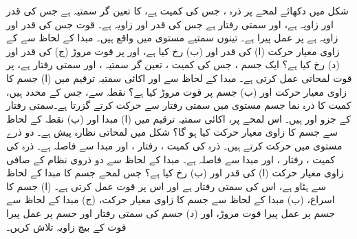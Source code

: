 شکل  میں دکھائے لمحے پر ذرہ ، جس کی کمیت  ہے، کا تعین گر سمتیہ  ہے  جس کی قدر  اور زاویہ  ہے، اور  سمتی رفتار  ہے جس کی قدر  اور زاویہ  ہے۔ قوت  جس کی قدر  اور زاویہ  ہے  پر عمل پیرا ہے۔  تینوں سمتیے  مستوی میں  واقع ہیں۔ مبدا کے لحاظ سے    کے زاوی معیار حرکت (ا) کی قدر اور (ب) رخ  کیا ہے، اور  پر قوت مروڑ (ج) کی قدر اور (د) رخ کیا ہے؟
ایک جسم ، جس کی کمیت  ، تعین گر سمتیہ ، اور سمتی رفتار 
ہے،  پر قوت  لمحاتی  عمل کرتی ہے۔ مبدا کے لحاظ سے  اور اکائی سمتیہ ترقیم میں  (ا) جسم  کا زاوی معیار حرکت اور (ب)  جسم پر قوت مروڑ کیا ہے؟
نقطہ  سے،  جس کے محدد  ہیں، کمیت  کا ذرہ نما جسم مستوی میں   سمتی رفتار سے حرکت کرتے  گزرتا  ہے۔سمتی رفتار کے جزو  اور  ہیں۔ اس لمحے پر، اکائی سمتیہ ترقیم میں (ا) مبدا اور (ب) نقطہ  کے لحاظ سے جسم  کا زاوی معیار حرکت کیا ہو گا؟
شکل  میں لمحاتی نظارہ پیش ہے۔ دو ذرے  مستوی میں حرکت کرتے ہیں۔ ذرہ    کی کمیت  ،  رفتار  ، اور مبدا   سے فاصلہ  ہے۔  ذرہ    کی کمیت  ،  رفتار  ، اور مبدا   سے فاصلہ  ہے۔ مبدا  کے لحاظ سے  دو ذروی نظام کے صافی زاوی معیار حرکت  (ا) کی قدر اور (ب) رخ کیا ہے؟
جس لمحے  جسم کا مبدا کے لحاظ سے ہٹاو  ہے، اس کی سمتی رفتار    ہے اور اس پر قوت  عمل کرتی ہے۔ (ا) جسم کا اسراع، (ب) مبدا کے لحاظ سے  جسم کا زاوی معیار حرکت، (ج) مبدا کے لحاظ سے جسم پر عمل پیرا  قوت مروڑ،  اور (د)  جسم  کی سمتی رفتار  اور  جسم پر عمل پیرا قوت کے بیچ زاویہ تلاش کریں۔
